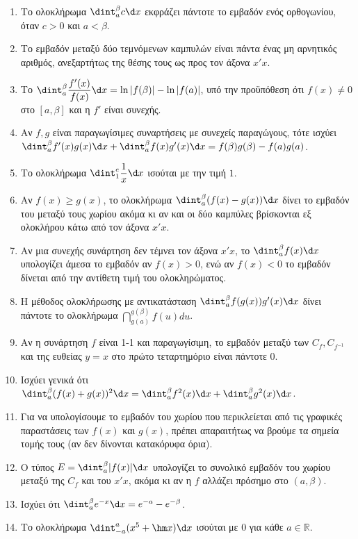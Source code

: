 \begin{enumerate}[label=\textbf{3.\arabic*.}]
    \item Το ολοκλήρωμα $\dint_a^\beta c \d x$ εκφράζει πάντοτε το εμβαδόν ενός ορθογωνίου, όταν $c > 0$ και $a < \beta$.
    \item Το εμβαδόν μεταξύ δύο τεμνόμενων καμπυλών είναι πάντα ένας μη αρνητικός αριθμός, ανεξαρτήτως της θέσης τους ως προς τον άξονα $x'x$.
    \item Το $\dint_{a}^{\beta} \dfrac{f'(x)}{f(x)} \d x = \ln|f(\beta)| - \ln|f(a)|$, υπό την προϋπόθεση ότι $f(x) \neq 0$ στο $[a, \beta]$ και η $f'$ είναι συνεχής.
    \item Αν $f, g$ είναι παραγωγίσιμες συναρτήσεις με συνεχείς παραγώγους, τότε ισχύει $\dint_{a}^{\beta} f'(x)g(x)\d x + \dint_{a}^{\beta} f(x)g'(x)\d x = f(\beta)g(\beta) - f(a)g(a)$.
    \item Το ολοκλήρωμα $\dint_1^e \dfrac{1}{x} \d x$ ισούται με την τιμή $1$.
    \item Αν $f(x) \ge g(x)$, το ολοκλήρωμα $\dint_a^\beta (f(x)-g(x))\d x$ δίνει το εμβαδόν του μεταξύ τους χωρίου ακόμα κι αν και οι δύο καμπύλες βρίσκονται εξ ολοκλήρου κάτω από τον άξονα $x'x$.
    \item Αν μια συνεχής συνάρτηση δεν τέμνει τον άξονα $x'x$, το $\dint_{a}^{\beta} f(x)\d x$ υπολογίζει άμεσα το εμβαδόν αν $f(x)>0$, ενώ αν $f(x)<0$ το εμβαδόν δίνεται από την αντίθετη τιμή του ολοκληρώματος.
    \item Η μέθοδος ολοκλήρωσης με αντικατάσταση $\dint_a^\beta f(g(x))g'(x)\d x$ δίνει πάντοτε το ολοκλήρωμα $\dint_{g(a)}^{g(\beta)} f(u)du$.
    \item Αν η συνάρτηση $f$ είναι 1-1 και παραγωγίσιμη, το εμβαδόν μεταξύ των $C_f, C_{f^{-1}}$ και της ευθείας $y=x$ στο πρώτο τεταρτημόριο είναι πάντοτε 0.
    \item Ισχύει γενικά ότι $\dint_a^\beta (f(x)+g(x))^2 \d x = \dint_a^\beta f^2(x) \d x + \dint_a^\beta g^2(x) \d x$.
    \item Για να υπολογίσουμε το εμβαδόν του χωρίου που περικλείεται από τις γραφικές παραστάσεις των $f(x)$ και $g(x)$, πρέπει απαραιτήτως να βρούμε τα σημεία τομής τους (αν δεν δίνονται κατακόρυφα όρια).
    \item Ο τύπος $E = \dint_a^\beta |f(x)|\d x$ υπολογίζει το συνολικό εμβαδόν του χωρίου μεταξύ της $C_f$ και του $x'x$, ακόμα κι αν η $f$ αλλάζει πρόσημο στο $(a, \beta)$.
    \item Ισχύει ότι $\dint_a^\beta e^{-x} \d x = e^{-a} - e^{-\beta}$.
    \item Το ολοκλήρωμα $\dint_{-a}^{a} (x^5 + \hm x)\d x$ ισούται με 0 για κάθε $a \in \mathbb{R}$.

\end{enumerate}
